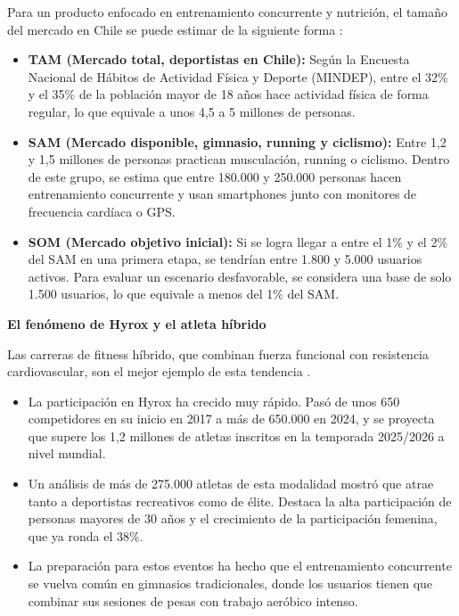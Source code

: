Para un producto enfocado en entrenamiento concurrente y nutrición, el tamaño del mercado en Chile se puede estimar de la siguiente forma \citep{mindep_habitos}:

\begin{itemize}
    \item \textbf{TAM (Mercado total, deportistas en Chile):} Según la Encuesta Nacional de Hábitos de Actividad Física y Deporte (MINDEP), entre el 32\% y el 35\% de la población mayor de 18 años hace actividad física de forma regular, lo que equivale a unos 4,5 a 5 millones de personas.
    \item \textbf{SAM (Mercado disponible, gimnasio, running y ciclismo):} Entre 1,2 y 1,5 millones de personas practican musculación, running o ciclismo. Dentro de este grupo, se estima que entre 180.000 y 250.000 personas hacen entrenamiento concurrente y usan smartphones junto con monitores de frecuencia cardíaca o GPS.
    \item \textbf{SOM (Mercado objetivo inicial):} Si se logra llegar a entre el 1\% y el 2\% del SAM en una primera etapa, se tendrían entre 1.800 y 5.000 usuarios activos. Para evaluar un escenario desfavorable, se considera una base de solo 1.500 usuarios, lo que equivale a menos del 1\% del SAM.
\end{itemize}

\vspace{0.3cm}
\textbf{El fenómeno de Hyrox y el atleta híbrido}

Las carreras de fitness híbrido, que combinan fuerza funcional con resistencia cardiovascular, son el mejor ejemplo de esta tendencia \citep{clarin_hyrox}.

\begin{itemize}
    \item La participación en Hyrox ha crecido muy rápido. Pasó de unos 650 competidores en su inicio en 2017 a más de 650.000 en 2024, y se proyecta que supere los 1,2 millones de atletas inscritos en la temporada 2025/2026 a nivel mundial.
    \item Un análisis de más de 275.000 atletas de esta modalidad mostró que atrae tanto a deportistas recreativos como de élite. Destaca la alta participación de personas mayores de 30 años y el crecimiento de la participación femenina, que ya ronda el 38\%.
    \item La preparación para estos eventos ha hecho que el entrenamiento concurrente se vuelva común en gimnasios tradicionales, donde los usuarios tienen que combinar sus sesiones de pesas con trabajo aeróbico intenso.
\end{itemize}

